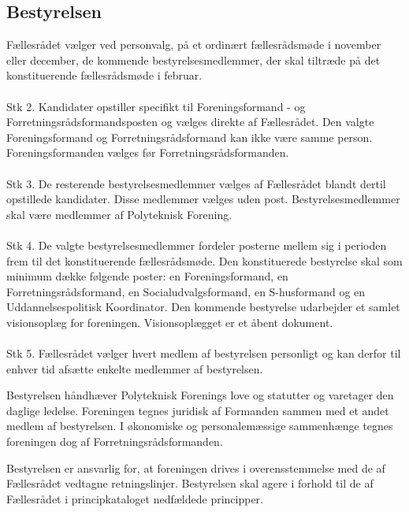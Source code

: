 \begin{list}

\subsection{Bestyrelsen}
\label{kap:bestyrelsen}
\item \label{L:best:valg} Fællesrådet vælger ved personvalg, på et ordinært fællesrådsmøde i november eller december, de kommende bestyrelsesmedlemmer, der skal tiltræde på det konstituerende fællesrådsmøde i februar. 
\\
\\
Stk 2. Kandidater opstiller specifikt til Foreningsformand - og Forretningsrådsformandsposten og vælges direkte af Fællesrådet. Den valgte Foreningsformand og Forretningsrådsformand kan ikke være samme person. Foreningsformanden vælges før Forretningsrådsformanden.
\\
\\
Stk 3. De resterende bestyrelsesmedlemmer vælges af Fællesrådet blandt dertil opstillede kandidater. Disse medlemmer vælges uden post. Bestyrelsesmedlemmer skal være medlemmer af Polyteknisk Forening.
\\
\\
Stk 4. De valgte bestyrelsesmedlemmer fordeler posterne mellem sig i perioden frem til det konstituerende fællesrådsmøde. Den konstituerede bestyrelse skal som minimum dække følgende poster: en Foreningsformand, en Forretningsrådsformand, en Socialudvalgsformand, en S-husformand og en Uddannelsespolitisk Koordinator. Den kommende bestyrelse udarbejder et samlet visionsoplæg for foreningen. Visionsoplægget er et åbent dokument.
\\
\\
Stk 5. Fællesrådet vælger hvert medlem af bestyrelsen personligt og kan derfor til enhver tid afsætte enkelte medlemmer af bestyrelsen.

\item Bestyrelsen håndhæver Polyteknisk Forenings love og statutter og varetager den daglige ledelse. Foreningen tegnes juridisk af Formanden sammen med et andet medlem af bestyrelsen. I økonomiske og personalemæssige sammenhænge tegnes foreningen dog af Forretningsrådsformanden.

\item Bestyrelsen er ansvarlig for, at foreningen drives i overensstemmelse med de af Fællesrådet vedtagne retningslinjer. Bestyrelsen skal agere i forhold til de af Fællesrådet i principkataloget nedfældede principper.


\end{list}
